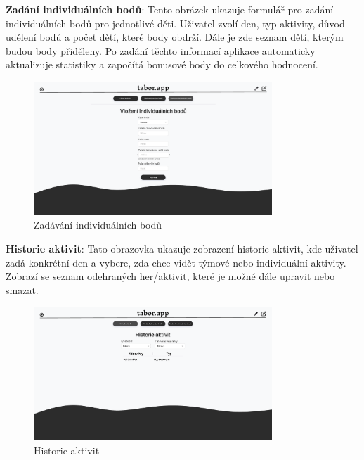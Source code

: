 \documentclass[a4paper, 12pt]{article} %
\begin{document}
\textbf{Zadání individuálních bodů}: Tento obrázek ukazuje formulář pro zadání 
individuálních bodů pro jednotlivé děti. Uživatel zvolí den, typ aktivity, důvod udělení 
bodů a počet dětí, které body obdrží. Dále je zde seznam dětí, kterým budou body 
přiděleny. Po zadání těchto informací aplikace automaticky aktualizuje statistiky a 
započítá bonusové body do celkového hodnocení.
\begin{figure}[h!]
    \centering
    \includegraphics[width=0.8\textwidth]{./pictures/picture6.png}
    \caption{Zadávání individuálních bodů}
\end{figure}

\textbf{Historie aktivit}: Tato obrazovka ukazuje zobrazení historie aktivit, kde uživatel 
zadá konkrétní den a vybere, zda chce vidět týmové nebo individuální aktivity. Zobrazí se 
seznam odehraných her/aktivit, které je možné dále upravit nebo smazat.
\begin{figure}[h!]
    \centering
    \includegraphics[width=0.8\textwidth]{./pictures/picture4.png}
    \caption{Historie aktivit}
\end{figure}

\newpage
\end{document}
